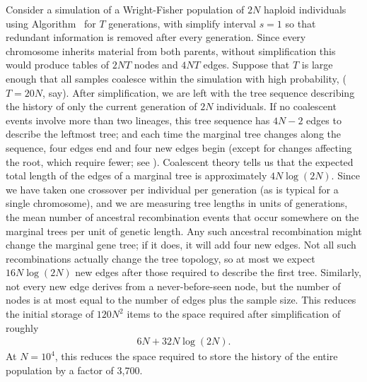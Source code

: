 \documentclass{article}
\begin{document}
Consider a simulation of a Wright-Fisher population of $2N$ haploid individuals
using Algorithm~ for $T$ generations,
with simplify interval $s = 1$ so that redundant information is removed after every generation.
Since every chromosome inherits material from both parents,
without simplification this would produce tables of
$2NT$ nodes and
$4NT$ edges.
Suppose that $T$ is large enough that all samples coalesce within the simulation with high probability,
($T = 20N$, say).
After simplification, we are left with the tree sequence describing the history
of only the current generation of $2N$ individuals.
If no coalescent events involve more than two lineages, this tree sequence has $4N-2$ edges to describe the leftmost tree;
and each time the marginal tree changes along the sequence,
four edges end and four new edges begin
(except for changes affecting the root, which require fewer; see \citet{kelleher2016efficient}).
Coalescent theory tells us that
the expected total length of the edges of a marginal tree is approximately $4N\log(2N)$.
Since we have taken one crossover per individual per generation (as is typical for a single chromosome),
and we are measuring tree lengths in units of generations,
the mean number of ancestral recombination events that occur somewhere on the marginal trees
per unit of genetic length.
Any such ancestral recombination might change the marginal gene tree;
if it does, it will add four new edges.
Not all such recombinations actually change the tree topology,
so at most we expect $16N\log(2N)$ new edges after those required to describe the first tree.
Similarly, not every new edge derives from a never-before-seen node,
but the number of nodes is at most equal to the number of edges plus the sample size.
This reduces the initial storage of $120 N^2$ items to
the space required after simplification of roughly
\begin{align}
    6N + 32 N \log(2N) .
\end{align}
At $N=10^4$, this reduces the space required to store the history of the entire population
by a factor of 3,700.
\end{document}
